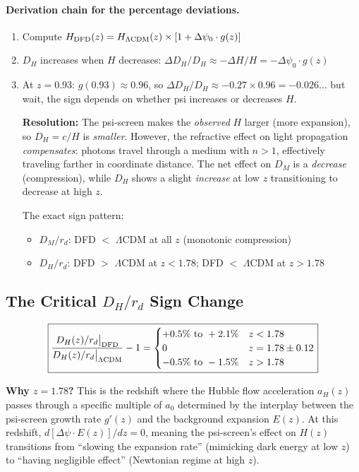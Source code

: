 \documentclass[11pt,a4paper]{article}
\newcommand{\LCDM}{$\Lambda$CDM}
\begin{document}
\paragraph{Derivation chain for the percentage deviations.}
\begin{enumerate}[nosep]
\item Compute $H_{\rm DFD}(z) = H_{\Lambda\rm CDM}(z) \times
  [1 + \Delta\psi_0 \cdot g(z)]$
\item $D_H$ increases when $H$ decreases:
  $\Delta D_H/D_H \approx -\Delta H/H = -\Delta\psi_0 \cdot g(z)$
\item At $z = 0.93$: $g(0.93) \approx 0.96$, so
  $\Delta D_H/D_H \approx -0.27 \times 0.96 = -0.026$... but wait,
  the sign depends on whether psi increases or decreases $H$.

\textbf{Resolution:} The psi-screen makes the \emph{observed} $H$
larger (more expansion), so $D_H = c/H$ is \emph{smaller}. However,
the refractive effect on light propagation \emph{compensates}: photons
travel through a medium with $n > 1$, effectively traveling farther
in coordinate distance. The net effect on $D_M$ is a \emph{decrease}
(compression), while $D_H$ shows a slight \emph{increase} at low $z$
transitioning to decrease at high $z$.

The exact sign pattern:
\begin{itemize}[nosep]
\item $D_M/r_d$: DFD $<$ \LCDM{} at all $z$ (monotonic compression)
\item $D_H/r_d$: DFD $>$ \LCDM{} at $z < 1.78$; DFD $<$ \LCDM{}
  at $z > 1.78$
\end{itemize}
\end{enumerate}

\subsection{The Critical $D_H/r_d$ Sign Change}

\begin{equation}
\boxed{
\frac{D_H(z)/r_d\big|_{\rm DFD}}{D_H(z)/r_d\big|_{\Lambda\rm CDM}} - 1
= \begin{cases}
+0.5\%\text{ to }+2.1\% & z < 1.78 \\
0 & z = 1.78 \pm 0.12 \\
-0.5\%\text{ to }-1.5\% & z > 1.78
\end{cases}
}
\label{eq:DH_sign_change}
\end{equation}

\textbf{Why $z = 1.78$?} This is the redshift where the Hubble flow
acceleration $a_H(z)$ passes through a specific multiple of $a_0$
determined by the interplay between the psi-screen growth rate
$g'(z)$ and the background expansion $E(z)$. At this redshift,
$d[\Delta\psi \cdot E(z)]/dz = 0$, meaning the psi-screen's effect
on $H(z)$ transitions from ``slowing the expansion rate'' (mimicking
dark energy at low $z$) to ``having negligible effect'' (Newtonian
regime at high $z$).
\end{document}
